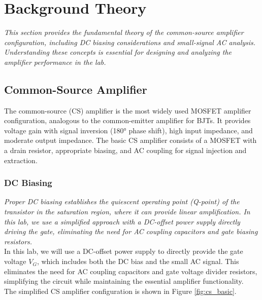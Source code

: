 \documentclass[10pt]{article}
\begin{document}
\section{Background Theory}

\textit{This section provides the fundamental theory of the common-source amplifier configuration, including DC biasing considerations and small-signal AC analysis. Understanding these concepts is essential for designing and analyzing the amplifier performance in the lab.} \\

\subsection{Common-Source Amplifier}

The common-source (CS) amplifier is the most widely used MOSFET amplifier configuration, analogous to the common-emitter amplifier for BJTs. It provides voltage gain with signal inversion (180° phase shift), high input impedance, and moderate output impedance. The basic CS amplifier consists of a MOSFET with a drain resistor, appropriate biasing, and AC coupling for signal injection and extraction.

\subsubsection{DC Biasing}

\textit{Proper DC biasing establishes the quiescent operating point (Q-point) of the transistor in the saturation region, where it can provide linear amplification. In this lab, we use a simplified approach with a DC-offset power supply directly driving the gate, eliminating the need for AC coupling capacitors and gate biasing resistors.} \\

In this lab, we will use a DC-offset power supply to directly provide the gate voltage $V_G$, which includes both the DC bias and the small AC signal. This eliminates the need for AC coupling capacitors and gate voltage divider resistors, simplifying the circuit while maintaining the essential amplifier functionality. \\

The simplified CS amplifier configuration is shown in Figure \ref{fig:cs_basic}. 
\end{document}
